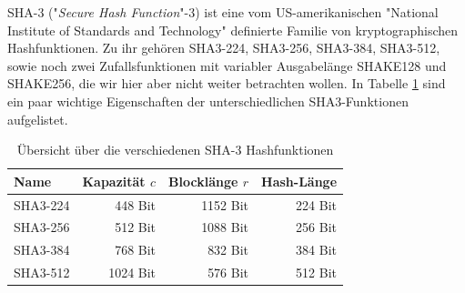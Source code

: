 SHA-3 ("\textit{Secure Hash Function}"-3) ist eine vom US-amerikanischen "National Institute of Standards and Technology"
definierte Familie von kryptographischen Hashfunktionen. Zu ihr gehören SHA3-224, SHA3-256, SHA3-384, SHA3-512,
sowie noch zwei Zufallsfunktionen mit variabler Ausgabelänge SHAKE128 und SHAKE256, die wir hier aber nicht weiter betrachten wollen.
In Tabelle \ref{tab:uebersicht_sha3} sind ein paar wichtige Eigenschaften der unterschiedlichen SHA3-Funktionen aufgelistet.\\

\begin{table}
	\centering
	\begin{tabular}{lrrr}
		Name & Kapazität $c$ & Blocklänge $r$ & Hash-Länge \\
		\hline
		SHA3-224 & 448 Bit & 1152 Bit & 224 Bit \\
		SHA3-256 & 512 Bit & 1088 Bit & 256 Bit \\
		SHA3-384 & 768 Bit & 832 Bit & 384 Bit \\
		SHA3-512 & 1024 Bit & 576 Bit & 512 Bit
	\end{tabular}
	\caption{Übersicht über die verschiedenen SHA-3 Hashfunktionen}
	\label{tab:uebersicht_sha3}
\end{table}

